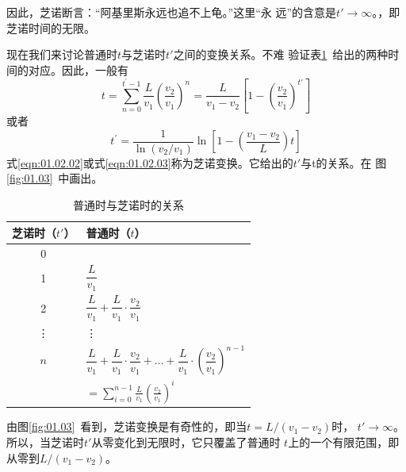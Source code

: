 因此，芝诺断言：“阿基里斯永远也追不上龟。”这里“永
远”的含意是$t'\rightarrow\infty$。，即芝诺时间的无限。

现在我们来讨论普通时$t$与芝诺时$t'$之间的变换关系。不难
验证表\ref{tab:01.02}~给出的两种时间的对应。因此，一般有
{\setlength{\mathindent}{5em}
\begin{equation}
    t=\sum_{n=0}^{t^{\prime}-1} \frac{L}{v_{1}}\left(\frac{v_{2}}{v_{1}}\right)^{n}=\frac{L}{v_{1}-v_{2}}\left[1-\left(\frac{v_{2}}{v_{1}}\right)^{t'}\right]
    \label{eqn:01.02.02}
\end{equation}}%
\clearpage
\noindent 或者\vspace{-1.2em}
\begin{equation}
    t^{\prime}=\frac{1}{\ln \left(v_{2} / v_{1}\right)} \ln \left[1-\left(\frac{v_{1}-v_{2}}{L}\right) t\right]
    \label{eqn:01.02.03}
\end{equation}%
式\eqref{eqn:01.02.02}或式\eqref{eqn:01.02.03}称为芝诺变换。它给出的$t'$与t的关系。在
图\ref{fig:01.03}~中画出。

\begin{table}[!h]
    \centering
    \vspace{-0.5em}
    \caption{普通时与芝诺时的关系}
    \label{tab:01.02}
    \begin{tabular*}{\linewidth}{c|>{\qquad}l}
        \toprule
        芝诺时（$t'$） & \hspace{7em}普通时（$t$） \\
        \midrule
        0       &   0   \\[1.75ex]
        1       &   $\dfrac{L}{v_1}$    \\[1.75ex]
        2       &   $\dfrac{L}{v_1} +\dfrac{L}{v_1}\cdot\dfrac{v_2}{v_1}$ \\[1.75ex]
        \vdots  &   \vdots  \\
        $n$     &   $\dfrac{L}{v_1} + \dfrac{L}{v_1}\cdot\dfrac{v_2}{v_1} + \dots +\dfrac{L}{v_1}\cdot\left(\dfrac{v_2}{v_1}\right)^{n-1} $  \\[1.75ex]
         & $= \displaystyle \sum_{i=0}^{n-1} \frac{L}{v_1}\left(\frac{v_2}{v_1}\right)^i$\\
        \bottomrule
    \end{tabular*}
\end{table}

由图\ref{fig:01.03}~看到，芝诺变换是有奇性的，即当$t=L/\left(v_1-v_2\right)$时，
$t'\rightarrow\infty$。所以，当芝诺时$t'$从零变化到无限时，它只覆盖了普通时
$t$上的一个有限范围，即从零到$ L/\left(v_1-v_2\right) $。

